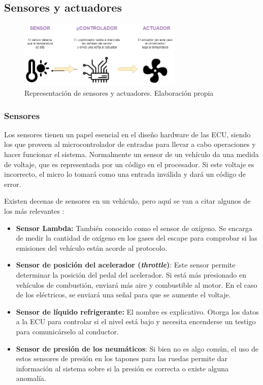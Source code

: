 \newpage
\subsection{Sensores y actuadores}

\begin{figure}[h]
    \centering
    \includegraphics[width=0.70\textwidth]{imagenes/diagrama_sensor_actuador.png}
    \caption{Representación de sensores y actuadores. Elaboración propia}
\end{figure}

\subsubsection{Sensores}

Los sensores tienen un papel esencial en el diseño hardware de las ECU, siendo los que proveen al microcontrolador de entradas para llevar a cabo operaciones y hacer funcionar el sistema. Normalmente un sensor de un vehículo da una medida de voltaje, que es representada por un código en el procesador. Si este voltaje es incorrecto, el micro lo tomará como una entrada inválida y dará un código de error. 

Existen decenas de sensores en un vehículo, pero aquí se van a citar algunos de los más relevantes \cite{ecu_sensores}:


\begin{itemize}
    \item \textbf{Sensor Lambda: }También conocido como el sensor de oxígeno. Se encarga de medir la cantidad de oxígeno en los gases del escape para comprobar si las emisiones del vehículo están acorde al protocolo. 
    \item \textbf{Sensor de posición del acelerador (\textit{throttle})}: Este sensor permite determinar la posición del pedal del acelerador. Si está más presionado en vehículos de combustión, enviará más aire y combustible al motor. En el caso de los eléctricos, se enviará una señal para que se aumente el voltaje.
    \item \textbf{Sensor de líquido refrigerante: }El nombre es explicativo. Otorga los datos a la ECU para controlar si el nivel está bajo y necesita encenderse un testigo para comunicárselo al conductor.
    \item \textbf{Sensor de presión de los neumáticos}: Si bien no es algo común, el uso de estos sensores de presión en los tapones para las ruedas permite dar información al sistema sobre si la presión es correcta o existe alguna anomalía.
\end{itemize}

